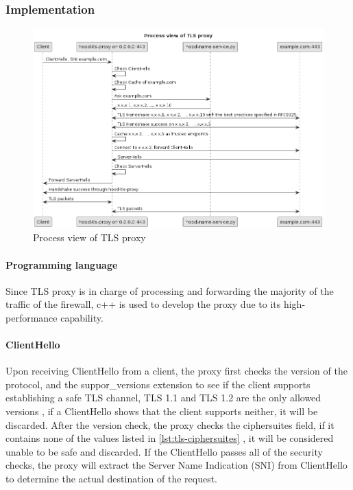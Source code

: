 \documentclass[mscthesis]{usiinfthesis}
\begin{document}
\subsubsection{Implementation}

\begin{figure}[H]
  \includegraphics[width=\textwidth]{graphics/puml/process-tls-proxy.png}
  \caption{Process view of TLS proxy}
  \label{fig:tls-proxy-process-view}
\end{figure}

\paragraph{Programming language}
Since TLS proxy is in charge of processing and forwarding the majority of the traffic of the firewall, c++ is used to develop the proxy due to its high-performance capability.
\paragraph{ClientHello}
Upon receiving ClientHello from a client, the proxy first checks the version of the protocol, and the suppor\_versions extension to see if the client supports establishing a safe TLS channel, TLS 1.1 and TLS 1.2 are the only allowed versions \citep{rfc:bstprc}, if a ClientHello shows that the client supports neither, it will be discarded. After the version check, the proxy checks the ciphersuites field, if it contains none of the values listed in \ref{lst:tls-ciphersuites} \citep{rfc:bstprc}, it will be considered unable to be safe and discarded. If the ClientHello passes all of the security checks, the proxy will extract the Server Name Indication (SNI) from ClientHello to determine the actual destination of the request.
\end{document}

